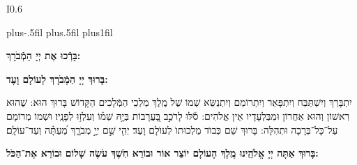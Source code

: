 \documentclass[twoside, openany, parskip=half, 11pt]{book}
\begin{document}
\newcommand{\barachu}{
\begin{wrapfigure}[5]{I}{0.6\textwidth}
\begin{minipage}{0.6\textwidth}
\leftskip=0pt plus-.5fil
\rightskip=0pt plus.5fil
\parfillskip=0pt plus1fil
\begin{large}

\shatz
\begin{Large}\textbf{בָּרְֿכוּ אֶת יְיָ הַמְֿבֹרָךְ:}\end{Large}
\end{large}

\vspace{12pt}

\shatzvkahal
\textbf{בָּרוּךְ יְיָ הַמְֿבֹרָךְ לְעוֹלָם וָעֶד:}
\end{minipage}
\end{wrapfigure}

\begin{footnotesize}
יִתְבָּרַךְ וְיִשְׁתַּבַּח וְיִתְפָּאַר וְיִתְרוֹמַם וְיִתְנַשֵּׂא שְׁמוֹ שֶׁל מֶֽלֶךְ מַלְכֵי הַמְּֿלָכִים הַקָּדוֹשׁ בָּרוּךְ הוּא: שֶׁהוּא רִאשׁוֹן וְהוּא אַחֲרוֹן וּמִבַּלְעָדָיו אֵין אֱלֹהִים: \source{תהלים סח}סֹ֡לּוּ לָרֹכֵ֣ב בָּ֭עֲרָבוֹת בְּיָ֥הּ שְׁמ֗וֹ וְעִלְז֥וּ לְפָנָֽיו׃ וּשְׁמוֹ מְרוֹמָם עַל־כָּל־בְּרָכָה וּתְהִלָּה: בָּרוּךְ שֵׁם כְּבוֺד מַלְכוּתוֺ לְעוֺלָם וָעֶד׃ \source{תהלים קיג}יְהִ֤י שֵׁ֣ם יְיָ֣ מְבֹרָ֑ךְ מֵ֝עַתָּ֗ה וְעַד־עוֹלָֽם׃ 

\end{footnotesize}
}


\barachu

\textbf{
בָּרוּךְ אַתָּה יְיָ אֱלֹהֵֽינוּ מֶֽלֶךְ הָעוֹלָם יוֹצֵר אוֹר וּבוֹרֵא חֹֽשֶׁךְ עֹשֶׂה שָׁלוֹם וּבוֹרֵא אֶת־הַכֹּל:
}

\newcommand{\hameir}{
\firstword{הַמֵּאִיר}
 לָאָֽרֶץ וְלַדָּרִים עָלֶֽיהָ בְּרַחֲמִים וּבְטוּבוֹ מְחַדֵּשׁ בְּכָל־יוֹם תָּמִיד מַעֲשֵׂה בְרֵאשִׁית: \source{תהלים קד}מָה־רַבּ֬וּ מַעֲשֶׂ֨יךָ ׀ יְיָ֗ כֻּ֭לָּם בְּחׇכְמָ֣ה עָשִׂ֑יתָ מָלְאָ֥ה הָ֝אָ֗רֶץ קִנְיָנֶֽךָ׃ הַמֶּֽלֶךְ הַמְֿרוֹמָם לְבַדּוֹ מֵאָז הַמְֿשֻׁבָּח וְהַמְֿפֹאָר וְהַמִּתְנַשֵּׂא מִימוֹת עוֹלָם: אֱלֹהֵי עוֹלָם בְּרַחֲמֶיךָ הָרַבִּים רַחֵם עָלֵינוּ אֲדוֹן עֻזֵּֽנוּ צוּר מִשְׂגַּבֵּנוּ מָגֵן יִשְׁעֵֽנוּ מִשְׂגָּב בַּעֲדֵֽנוּ: אֵ֗ל בָּ֗רוּךְ גְּ֗דוֹל דֵּ֗עָה הֵ֗כִין וּ֗פָעַל זָ֗הֳרֵי חַ֗מָּה ט֗וֹב יָ֗צַר כָּ֗בוֹד לִ֗שְׁמוֹ מְ֗אוֹרוֹת נָ֗תַן סְ֗בִיבוֹת עֻ֗זּוֹ פִּ֗נּוֹת צְ֗בָאָיו קְ֗דוֹשִׁים ר֗וֹמֲמֵי שַׁ֗דַּי תָּ֗מִיד מְסַפְּֿרִים כְּבוֹד־אֵל וּקְדֻשָׁתוֹ: תִּתְבָּרַךְ יְיָ אֱלֹהֵֽינוּ עַל־שֶׁבַח מַעֲשֵׂי יָדֶֽיךָ וְעַל־מְאֽוֹרֵי אוֹר שֶׁעָשִֽׂיתָ יְפָאֲרֽוּךָ סֶּֽלָה:
}

\newcommand{\kadoshkadoshkadosh}{•}
\end{document}
